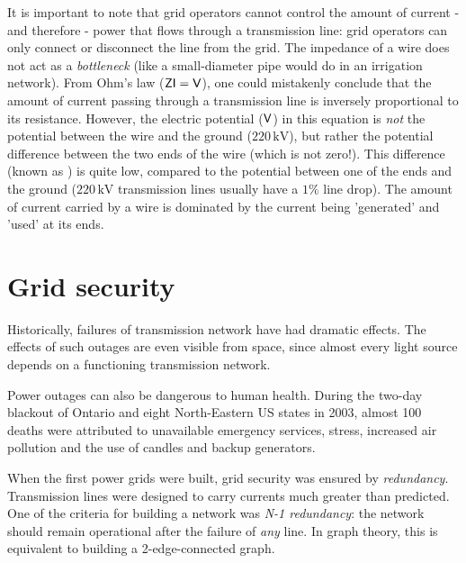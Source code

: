 \documentclass[main.tex]{subfiles}
\begin{document}
It is important to note that grid operators cannot control the amount of current - and therefore - power that flows through a transmission line: grid operators can only connect or disconnect the line from the grid. The impedance of a wire does not act as a \emph{bottleneck} (like a small-diameter pipe would do in an irrigation network). From Ohm's law ($\mathsf{ZI=V}$), one could mistakenly conclude that the amount of current passing through a transmission line is inversely proportional to its resistance. However, the electric potential ($\mathsf{V}$) in this equation is \emph{not} the potential between the wire and the ground (\eg $220\,\si{\kilo\volt}$), but rather the potential difference between the two ends of the wire (which is not zero!). This difference (known as ) is quite low, compared to the potential between one of the ends and the ground ($220\,\si{\kilo\volt}$ transmission lines usually have a $1\si{\percent}$ line drop). The amount of current carried by a wire is dominated by the current being 'generated' and 'used' at its ends.
%

\section{Grid security}\label{sec:powerflow}
Historically, failures of transmission network have had dramatic effects. The effects of such outages are even visible from space, since almost every light source depends on a functioning transmission network. 

Power outages can also be dangerous to human health. During the two-day blackout of Ontario and eight North-Eastern US states in 2003, almost 100 deaths were attributed to unavailable emergency services, stress, increased air pollution and the use of candles and backup generators.

%
%
%
When the first power grids were built, grid security was ensured by \emph{redundancy}. Transmission lines were designed to carry currents much greater than predicted. One of the criteria for building a network was \emph{N-1 redundancy}: the network should remain operational after the failure of \emph{any} line. In graph theory, this is equivalent to building a 2-edge-connected graph.
\end{document}
